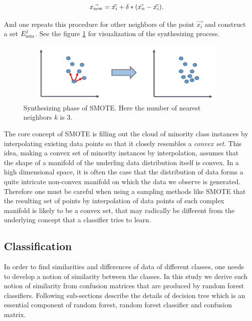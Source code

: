 \documentclass[..]{revtex4}
\begin{document}
		\begin{equation}
		\vec{x_{\rm{new}}} = \vec{x_{i}} + \delta*(\vec{x_{n}} - \vec{x_{i}}).
		\end{equation}

And one repeats this procedure for other neighbors of the point $\vec{x_i}$ and construct a set $E_{\rm{min}}^j$. See the figure \ref{smote} for visualization of the synthesizing process.	
		
		\begin{figure}[ht]
		\begin{center}
		\vspace{0.5cm}
		\includegraphics[clip,width=12cm,height = 3cm]{figs/SMOTE.png}
		\vspace{0.5cm}
		\caption{Synthesizing phase of SMOTE. Here the number of nearest neighbors $k$ is 3.}
		\label{smote}
		\end{center}
		\end{figure}
		

The core concept of SMOTE is filling out the cloud of minority class instances by interpolating existing data points so that it closely resembles a \textit{convex set}. This idea, making a convex set of minority instances by interpolation, assumes that the shape of a manifold of the underling data distribution itself is convex. In a high dimensional space, it is often the case that the distribution of data forms a quite intricate non-convex manifold on which the data we observe is generated. Therefore one must be careful when using a sampling methods like SMOTE that the resulting set of points by interpolation of data points of such complex manifold is likely to be a convex set, that may radically be different from the underlying concept that a classifier tries to learn.

	\subsection{Classification}
	In order to find similarities and differences of data of different classes, one needs to develop a notion of similarity between the classes. In this study we derive such notion of similarity from confusion matrices that are produced by random forest classifiers. Following sub-sections describe the details of decision tree which is an essential component of random forest, random forest classifier and confusion matrix.
	
\end{document}
